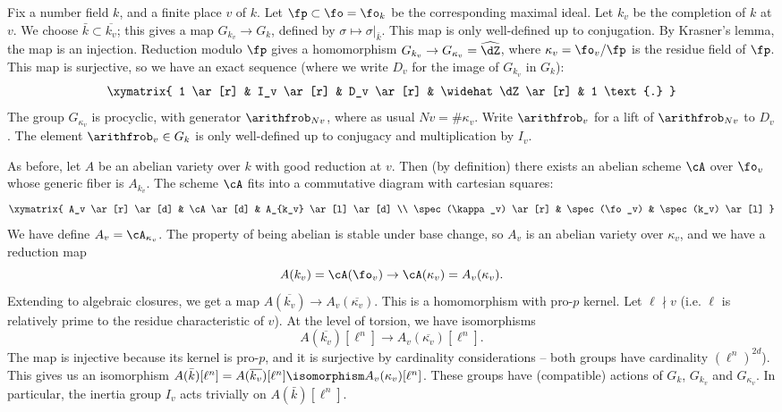 Fix a number field $k$, and a finite place $v$ of $k$. Let 
$\fp\subset \fo=\fo_k$ be the corresponding maximal ideal. Let $k_v$ be the 
completion of $k$ at $v$. We choose $\bar k\subset \overline{k_v}$; this gives 
a map $G_{k_v} \to G_k$, defined by $\sigma\mapsto \sigma|_{\bar k}$. This map 
is only well-defined up to conjugation. By Krasner's lemma, the map is an 
injection. Reduction modulo $\fp$ gives a homomorphism 
$G_{k_v} \to G_{\kappa_v}=\widehat\dZ$, where $\kappa_v = \fo_v/\fp$ is the 
residue field of $\fp$. This map is surjective, so we have an exact sequence 
(where we write $D_v$ for the image of $G_{k_v}$ in $G_k$):
\[\xymatrix{
  1 \ar[r] 
    & I_v \ar[r] 
    & D_v \ar[r] 
    & \widehat\dZ \ar[r] 
    & 1 \text{.}
}\]
The group $G_{\kappa_v}$ is procyclic, with generator 
$\arithfrob_{N v}$, where as usual $N v = \# \kappa_v$. Write $\arithfrob_v$ for a lift 
of $\arithfrob_{N v}$ to $D_v$. The element $\arithfrob_v\in G_k$ is only well-defined up 
to conjugacy and multiplication by $I_v$. 

As before, let $A$ be an abelian variety over $k$ with good reduction at $v$. 
Then (by definition) there exists an abelian scheme $\cA$ over $\fo_v$ whose 
generic fiber is $A_{k_v}$. The scheme $\cA$ fits into a commutative diagram 
with cartesian squares: 
\[\xymatrix{
  A_v \ar[r] \ar[d] 
    & \cA \ar[d] 
    & A_{k_v} \ar[l] \ar[d] \\
  \spec(\kappa_v) \ar[r] 
    & \spec(\fo_v) 
    & \spec(k_v) \ar[l] 
}\]
We have define $A_v=\cA_{\kappa_v}$. The property of being abelian is stable 
under base change, so $A_v$ is an abelian variety over $\kappa_v$, and we have 
a reduction map 
\[
  A(k_v) = \cA(\fo_v) \to \cA(\kappa_v) = A_v(\kappa_v) \text{.}
\]
Extending to algebraic closures, we get a map 
$A(\overline{k_v}) \to A_v(\overline{\kappa_v})$. This is a homomorphism with 
pro-$p$ kernel. Let $\ell\nmid v$ (i.e. $\ell$ is relatively prime to the 
residue characteristic of $v$). At the level of torsion, we have isomorphisms 
\[
  A(\overline{k_v})[\ell^n] \to A_v(\overline{\kappa_v})[\ell^n] \text{.}
\]
The map is injective because its kernel is pro-$p$, and it is surjective by 
cardinality considerations -- both groups have cardinality $(\ell^n)^{2 d}$). 
This gives us an isomorphism 
$A(\bar k)[\ell^n] = A(\overline{k_v})[\ell^n]\isomorphism A_v(\kappa_v)[\ell^n]$. 
These groups have (compatible) actions of $G_k$, $G_{k_v}$ and $G_{\kappa_v}$. In 
particular, the inertia group $I_v$ acts trivially on $A(\bar k)[\ell^n]$. 

